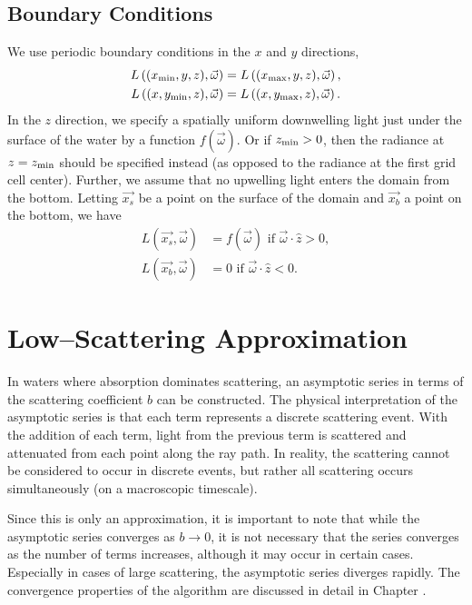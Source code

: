 \subsection{Boundary Conditions}

We use periodic boundary conditions in the $x$ and $y$ directions,
\begin{align*}
  L\left(({x_{\min}}, y, z), \vec{\omega}\right) &= L\left(({x_{\max}}, y, z), \vec{\omega}\right), \\
  L\left((x, {y_{\min}}, z), \vec{\omega}\right) &= L\left((x, {y_{\max}}, z), \vec{\omega}\right).
\end{align*}
In the $z$ direction, we specify a spatially uniform downwelling light just
under the surface of the water by a function $f(\vec{\omega})$.
Or if ${z_{\min}}>0$, then the radiance at $z={z_{\min}}$ should be specified instead (as opposed to the radiance at the first grid cell center).
Further, we assume that no upwelling light enters the domain from the bottom.
Letting $\vec{x_s}$ be a point on the surface of the domain and $\vec{x_b}$ a point on the bottom, we have
\begin{align*}
  L(\vec{x_s}, \vec{\omega}) &= f(\vec{\omega}) \mbox{ if } \vec{\omega} \cdot \hat{z} > 0, \\
  L(\vec{x_b}, \vec{\omega}) &= 0 \mbox { if } \vec{\omega} \cdot \hat{z} < 0.
\end{align*}

\section{Low--Scattering Approximation}
\label{sec:symbolic_asymptotics}
In waters where absorption dominates scattering, an asymptotic series in terms of the scattering coefficient $b$ can be constructed.
The physical interpretation of the asymptotic series is that each term represents a discrete scattering event.
With the addition of each term, light from the previous term is scattered and attenuated from each point along the ray path.
In reality, the scattering cannot be considered to occur in discrete events, but rather all scattering occurs simultaneously (on a macroscopic timescale).

Since this is only an approximation, it is important to note that while the asymptotic series converges as $b \to 0$, it is not necessary that the series converges as the number of terms increases, although it may occur in certain cases.
Especially in cases of large scattering, the asymptotic series diverges rapidly.
The convergence properties of the algorithm are discussed in detail in Chapter \Rom{\ref{chap:model_analysis}}.

